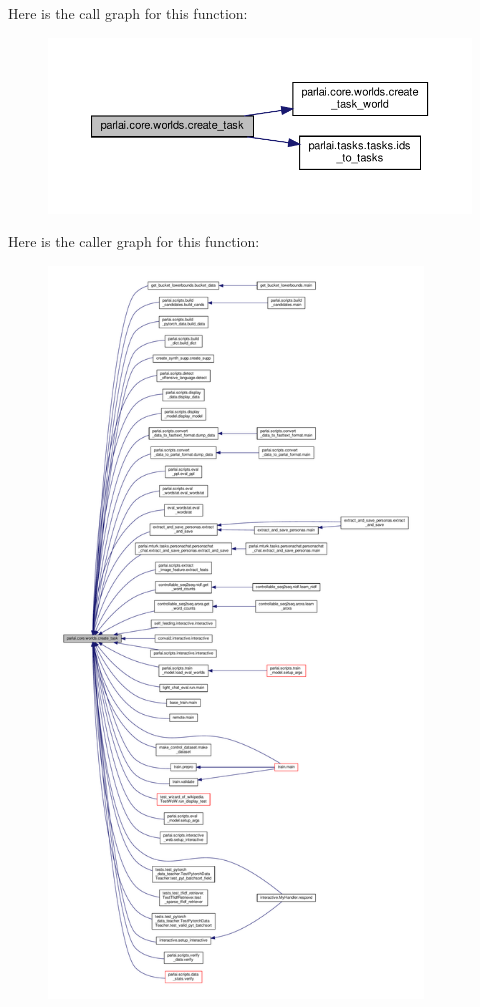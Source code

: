 Here is the call graph for this function\+:
\nopagebreak
\begin{figure}[H]
\begin{center}
\leavevmode
\includegraphics[width=350pt]{namespaceparlai_1_1core_1_1worlds_a11923c10b545c7ecc1b08fe2242d9c2c_cgraph}
\end{center}
\end{figure}
Here is the caller graph for this function\+:
\nopagebreak
\begin{figure}[H]
\begin{center}
\leavevmode
\includegraphics[height=550pt]{namespaceparlai_1_1core_1_1worlds_a11923c10b545c7ecc1b08fe2242d9c2c_icgraph}
\end{center}
\end{figure}
